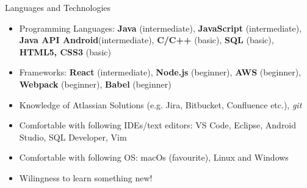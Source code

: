 \documentclass[]{mcdowellcv}
\begin{document}
  \begin{cvsection}{Languages and Technologies}
		\begin{cvsubsection}{}{}{}	
			\begin{itemize}
        \item Programming Languages: \textbf{Java} (intermediate), \textbf{JavaScript} (intermediate), \textbf{Java API Android}(intermediate),  \textbf{C/C++} (basic), \textbf{SQL} (basic), \textbf{HTML5, CSS3} (basic)
        \item Frameworks: \textbf{React} (intermediate), \textbf{Node.js} (beginner), \textbf{AWS} (beginner), \textbf{Webpack} (beginner), \textbf{Babel} (beginner)
				\item Knowledge of Atlassian Solutions (e.g. Jira, Bitbucket, Confluence etc.), \textit{git}
				\item Comfortable with following IDEs/text editors: VS Code, Eclipse, Android Studio, SQL Developer, Vim
				\item Comfortable with following OS: macOs (favourite), Linux and Windows
				\item Wilingness to learn something new!
			\end{itemize}
		\end{cvsubsection}
	\end{cvsection}
	
\end{document}
